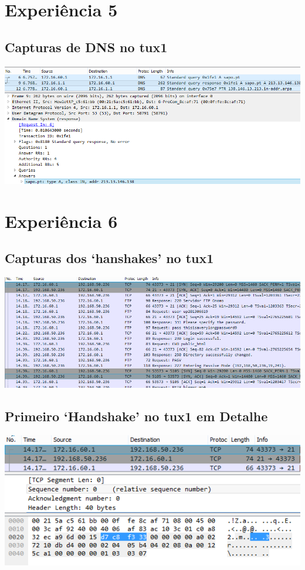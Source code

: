 \documentclass[11pt,a4paper,reqno]{report}
\numberwithin{equation}{section}
\begin{document}
\begin{appendices}
\section{Experiência 5}%

\subsection{Capturas de DNS no tux1}
\label{ex5_dns}
\includegraphics[width=16cm]{ex5_dns.png}

\section{Experiência 6}%

\subsection{Capturas dos `hanshakes' no tux1}
\label{ex6_tux1_handshakes}
\includegraphics[width=16cm]{ex6_tux1_handshakes.png}

\subsection{Primeiro `Handshake' no tux1 em Detalhe}
\label{ex6_tux1_1sthandshake}
\includegraphics[width=16cm]{ex6_handshake1.png}


\end{appendices}
\end{document}
